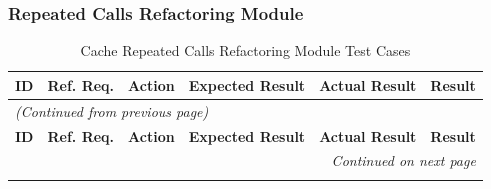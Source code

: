 \documentclass[12pt, titlepage]{article}
\begin{document}
\subsubsection{Repeated Calls Refactoring Module}

\begin{longtable}{c 
  >{\raggedright\arraybackslash}p{1.5cm} 
  >{\raggedright\arraybackslash}p{4.5cm} 
  >{\raggedright\arraybackslash}p{4cm} 
  >{\raggedright\arraybackslash}p{3cm} c}
  \toprule
  \textbf{ID} & \textbf{Ref. Req.} & \textbf{Action} & \textbf{Expected Result} & \textbf{Actual Result} & \textbf{Result} \\ 
  \midrule
  \endfirsthead

  \multicolumn{6}{l}{\textit{(Continued from previous page)}} \\ 
  \toprule
  \textbf{ID} & \textbf{Ref. Req.} & \textbf{Action} & \textbf{Expected Result} & \textbf{Actual Result} & \textbf{Result} \\ 
  \midrule
  \endhead

  \multicolumn{6}{r}{\textit{Continued on next page}} \\
  \endfoot

  \bottomrule
  \caption{Cache Repeated Calls Refactoring Module Test Cases}
  \label{table:crc_refactor_tests}
  \endlastfoot


\end{longtable}
\end{document}
